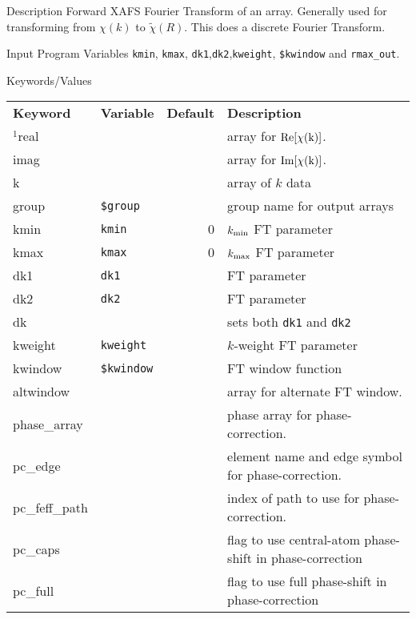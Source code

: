 
\begin{IFFcom}
\item[Description] Forward XAFS Fourier Transform of an array.  Generally
  used for transforming from $\chi(k)$ to $\tilde\chi(R)$.  This does a
  discrete Fourier Transform.
\item[Input Program Variables] {\tt{kmin}}, {\tt{kmax}},
  {\tt{dk1}},{\tt{dk2}},{\tt{kweight}}, {\tt{\$kwindow}} and
  {\tt{rmax\_out}}.
\item[Keywords/Values] 
{\relax \hspace{0.25truein}\par\noindent\relax}
\begin{tabular}{llrl}
  \textbf{Keyword} & \textbf{Variable} & \textbf{Default} &
  \textbf{Description}\\
  \noalign{\smallskip}
  ${}^{1}${real} &               &  & array for $\rm Re[\chi(k)]$. \\
  {imag}      &                  &  & array for $\rm Im[\chi(k)]$. \\
  k           &                  &  & array of $k$ data \\
  group       & {\tt{\$group}}   &  & group name for output arrays \\ 
  kmin        & {\tt{kmin}}      & 0& $k_{\rm min}$ FT parameter  \\ 
  kmax        & {\tt{kmax}}      & 0& $k_{\rm max}$ FT parameter  \\ 
  dk1         & {\tt{dk1}}       &  & FT parameter  \\ 
  dk2         & {\tt{dk2}}       &  & FT parameter  \\ 
  dk          &                  &  & sets both {\tt{dk1}} and {\tt{dk2}}\\  
  kweight     & {\tt{kweight}}   &  & $k$-weight  FT parameter \\ 
  kwindow     & {\tt{\$kwindow}} &  & FT window function  \\ 
  altwindow   &                  &  & array for alternate FT window.  \\ 
  \noalign{\smallskip}
  phase\_array  &                &  & phase array for phase-correction.\\
  pc\_edge    &    &  & element name and edge symbol for  phase-correction.\\
  pc\_feff\_path   &    &  & index of path to use for phase-correction.\\
  pc\_caps         &    &  & flag to use central-atom phase-shift in phase-correction \\
  pc\_full         &    &  & flag to use full phase-shift in phase-correction \\
\end{tabular}


\end{IFFcom}
